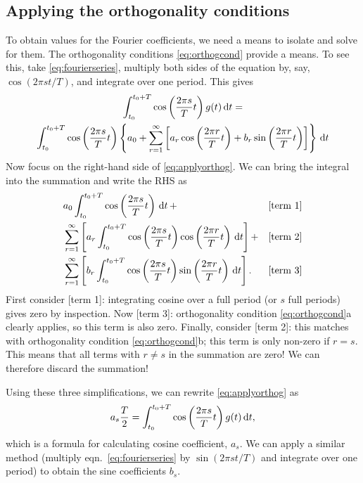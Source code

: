 \documentclass[11pt,twoside,a4paper]{article}
\begin{document}
\subsection{Applying the orthogonality conditions}
To obtain values for the Fourier coefficients, we need a means to
isolate and solve for them.  The orthogonality conditions
\eqref{eq:orthogcond} provide a means.  To see this, take
\autoref{eq:fourierseries}, multiply both sides of the equation by,
say, $\cos(2\pi s t/T)$, and integrate over one period.  This gives
\begin{multline}
  \label{eq:applyorthog}
  \int_{t_0}^{t_0+T}\cos\left(\frac{2\pi s}{T}t\right)g(t)\,\textrm{d} t = \\ 
  \int_{t_0}^{t_0+T}\cos\left(\frac{2\pi s}{T}t\right)\left\{
    a_0 + \sum_{r=1}^\infty
    \left[a_r\cos\left(\frac{2\pi r}{T}t\right) +
      b_r\sin\left(\frac{2\pi r}{T}t\right)\right] \right\}\,\textrm{d} t
\end{multline}
Now focus on the right-hand side of \autoref{eq:applyorthog}. We can
bring the integral into the summation and write the RHS as
\begin{align}
  &a_0\int_{t_0}^{t_0+T}\cos\left(\frac{2\pi s}{T}t\right)\,\textrm{d} t\,+ &
  &\text{[term 1]} \nonumber\\
   &\sum_{r=1}^\infty\left[a_r\int_{t_0}^{t_0+T}\cos\left(\frac{2\pi
        s}{T}t\right)\cos\left(\frac{2\pi r}{T}t\right)\,\textrm{d}
    t\right] + & &\text{[term 2]}\nonumber\\
    &\sum_{r=1}^\infty\left[b_r\int_{t_0}^{t_0+T}\cos\left(\frac{2\pi s}{T}t\right)
    \sin\left(\frac{2\pi r}{T}t\right)\,\textrm{d} t \right]. & &\text{[term
    3]} \nonumber
\end{align}
First consider [term 1]: integrating cosine over a full period (or $s$
full periods) gives zero by inspection.  Now [term 3]: orthogonality
condition \autoref{eq:orthogcond}a clearly applies, so this term is
also zero.  Finally, consider [term 2]: this matches with
orthogonality condition \autoref{eq:orthogcond}b; this term is only
non-zero if $r=s$.  This means that all terms with $r\ne s$ in the
summation are zero!  We can therefore discard the summation!

Using these three simplifications, we can rewrite
\autoref{eq:applyorthog} as
\begin{equation}
  \label{eq:cosinecoef}
  a_s\frac{T}{2} = \int_{t_0}^{t_0+T}\cos\left(\frac{2\pi s}{T}t 
  \right)g(t)\,\textrm{d} t,
\end{equation}
which is a formula for calculating cosine coefficient, $a_s$.  We can
apply a similar method (multiply eqn.~\eqref{eq:fourierseries} by
$\sin(2\pi s t/T)$ and integrate over one period) to obtain the sine
coefficients $b_s$.
\end{document}
